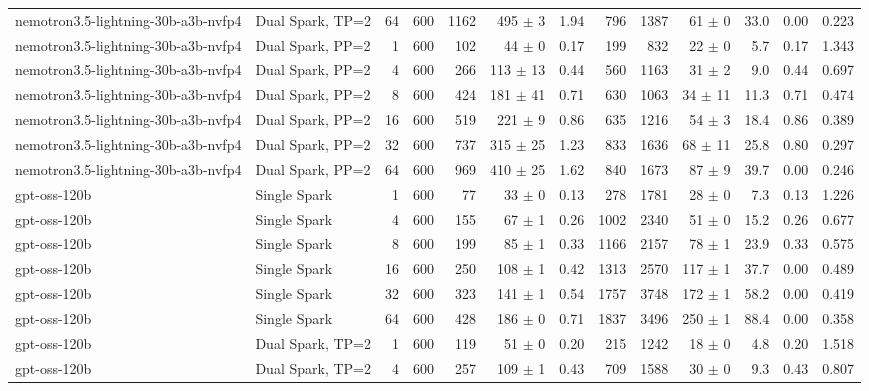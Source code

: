 \begin{tabular}{l l r r r r r r r r r r r}
nemotron3.5-lightning-30b-a3b-nvfp4 & Dual Spark, TP=2 & 64 & 600 & 1162 & 495 $\pm$ 3 & 1.94 & 796 & 1387 & 61 $\pm$ 0 & 33.0 & 0.00 & 0.223 \\
\addlinespace
nemotron3.5-lightning-30b-a3b-nvfp4 & Dual Spark, PP=2 & 1 & 600 & 102 & 44 $\pm$ 0 & 0.17 & 199 & 832 & 22 $\pm$ 0 & 5.7 & 0.17 & 1.343 \\
nemotron3.5-lightning-30b-a3b-nvfp4 & Dual Spark, PP=2 & 4 & 600 & 266 & 113 $\pm$ 13 & 0.44 & 560 & 1163 & 31 $\pm$ 2 & 9.0 & 0.44 & 0.697 \\
nemotron3.5-lightning-30b-a3b-nvfp4 & Dual Spark, PP=2 & 8 & 600 & 424 & 181 $\pm$ 41 & 0.71 & 630 & 1063 & 34 $\pm$ 11 & 11.3 & 0.71 & 0.474 \\
nemotron3.5-lightning-30b-a3b-nvfp4 & Dual Spark, PP=2 & 16 & 600 & 519 & 221 $\pm$ 9 & 0.86 & 635 & 1216 & 54 $\pm$ 3 & 18.4 & 0.86 & 0.389 \\
nemotron3.5-lightning-30b-a3b-nvfp4 & Dual Spark, PP=2 & 32 & 600 & 737 & 315 $\pm$ 25 & 1.23 & 833 & 1636 & 68 $\pm$ 11 & 25.8 & 0.80 & 0.297 \\
nemotron3.5-lightning-30b-a3b-nvfp4 & Dual Spark, PP=2 & 64 & 600 & 969 & 410 $\pm$ 25 & 1.62 & 840 & 1673 & 87 $\pm$ 9 & 39.7 & 0.00 & 0.246 \\
\addlinespace
gpt-oss-120b & Single Spark & 1 & 600 & 77\rlap{$^\dagger$} & 33 $\pm$ 0 & 0.13 & 278 & 1781 & 28 $\pm$ 0 & 7.3 & 0.13 & 1.226 \\
gpt-oss-120b & Single Spark & 4 & 600 & 155 & 67 $\pm$ 1 & 0.26 & 1002 & 2340 & 51 $\pm$ 0 & 15.2 & 0.26 & 0.677 \\
gpt-oss-120b & Single Spark & 8 & 600 & 199 & 85 $\pm$ 1 & 0.33 & 1166 & 2157 & 78 $\pm$ 1 & 23.9 & 0.33 & 0.575 \\
gpt-oss-120b & Single Spark & 16 & 600 & 250 & 108 $\pm$ 1 & 0.42 & 1313 & 2570 & 117 $\pm$ 1 & 37.7 & 0.00 & 0.489 \\
gpt-oss-120b & Single Spark & 32 & 600 & 323 & 141 $\pm$ 1 & 0.54 & 1757 & 3748 & 172 $\pm$ 1 & 58.2 & 0.00 & 0.419 \\
gpt-oss-120b & Single Spark & 64 & 600 & 428 & 186 $\pm$ 0 & 0.71 & 1837 & 3496 & 250 $\pm$ 1 & 88.4 & 0.00 & 0.358 \\
\addlinespace
gpt-oss-120b & Dual Spark, TP=2 & 1 & 600 & 119 & 51 $\pm$ 0 & 0.20 & 215 & 1242 & 18 $\pm$ 0 & 4.8 & 0.20 & 1.518 \\
gpt-oss-120b & Dual Spark, TP=2 & 4 & 600 & 257 & 109 $\pm$ 1 & 0.43 & 709 & 1588 & 30 $\pm$ 0 & 9.3 & 0.43 & 0.807 \\

\end{tabular}
